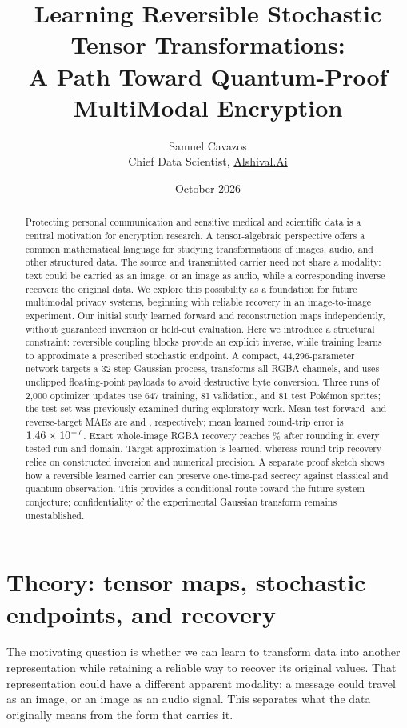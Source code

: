 \documentclass[10pt]{article}
\title{Learning Reversible Stochastic Tensor Transformations:\\A Path Toward Quantum-Proof MultiModal Encryption}
\author{Samuel Cavazos\\Chief Data Scientist, \href{https://alshival.ai}{Alshival.Ai}}
\date{October 2026}
\begin{document}
\maketitle
\begin{abstract}
Protecting personal communication and sensitive medical and scientific data is
a central motivation for encryption research. A tensor-algebraic perspective
offers a common mathematical language for studying transformations of images,
audio, and other structured data. The source and transmitted carrier
need not share a modality: text could be carried as an image, or an image as
audio, while a corresponding inverse recovers the original data. We explore
this possibility as a foundation for future multimodal privacy systems,
beginning with reliable recovery in an image-to-image experiment.
Our initial study learned forward and reconstruction maps independently,
without guaranteed inversion or held-out evaluation. Here we introduce a structural constraint:
reversible coupling blocks provide an explicit inverse, while training learns
to approximate a prescribed stochastic endpoint. A compact, 44,296-parameter
network targets a 32-step Gaussian process, transforms all RGBA channels, and
uses unclipped floating-point payloads to avoid destructive byte conversion.
Three runs of 2,000 optimizer updates use 647 training, 81 validation, and 81 test
Pok\'emon sprites; the test set was previously examined during exploratory work.
Mean test forward- and reverse-target MAEs are
\ForwardMAE{} and \ReverseMAE{}, respectively; mean learned round-trip error is
$1.46\times10^{-7}$. Exact whole-image RGBA recovery reaches \ExactRate\% after
rounding in every tested run and domain. Target approximation is learned, whereas
round-trip recovery relies on constructed inversion and numerical precision.
A separate proof sketch shows how a reversible learned carrier can preserve
one-time-pad secrecy against classical and quantum observation. This provides
a conditional route toward the future-system conjecture; confidentiality of
the experimental Gaussian transform remains unestablished.
\end{abstract}

\section{Theory: tensor maps, stochastic endpoints, and recovery}
The motivating question is whether we can learn to transform data into another
representation while retaining a reliable way to recover its original values.
That representation could have a different apparent modality: a message could
travel as an image, or an image as an audio signal. This separates what the data
originally means from the form that carries it.
\end{document}
